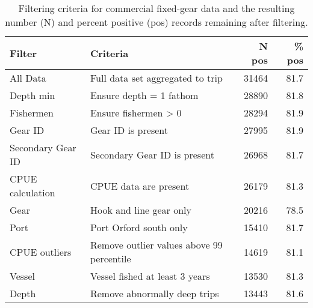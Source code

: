 
\begin{longtable}[t]{l>{\raggedright\arraybackslash}p{6cm}rr}
\caption{\label{tab:cpue-commercialfixed-gear-filter}Filtering criteria for commercial fixed-gear data and the resulting number (N) and percent positive (pos) records remaining after filtering.}\\
\toprule
Filter & Criteria & N pos & \% pos\\
\midrule
All Data & Full data set aggregated to trip & 31464 & 81.7\\
Depth min & Ensure depth = 1 fathom & 28890 & 81.8\\
Fishermen & Ensure fishermen > 0 & 28294 & 81.9\\
Gear ID & Gear ID is present & 27995 & 81.9\\
Secondary Gear ID & Secondary Gear ID is present & 26968 & 81.7\\
\addlinespace
CPUE calculation & CPUE data are present & 26179 & 81.3\\
Gear & Hook and line gear only & 20216 & 78.5\\
Port & Port Orford south only & 15410 & 81.7\\
CPUE outliers & Remove outlier values above 99 percentile & 14619 & 81.1\\
Vessel & Vessel fished at least 3 years & 13530 & 81.3\\
\addlinespace
Depth & Remove abnormally deep trips & 13443 & 81.6\\
\bottomrule
\end{longtable}
